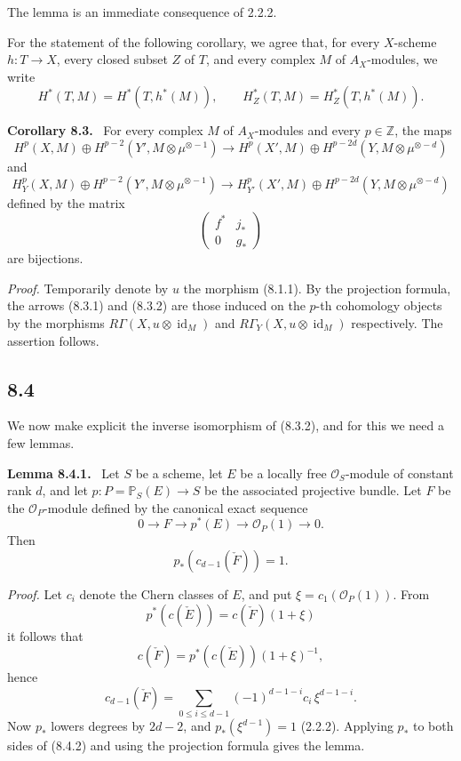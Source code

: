 \documentclass[11pt]{article}
\newenvironment{statement}[1]{\par\medskip\noindent\textbf{#1.}\ }{\par\medskip}
\begin{document}
The lemma is an immediate consequence of 2.2.2.

For the statement of the following corollary, we agree that, for every $X$-scheme $h:T\to X$, every closed subset $Z$ of $T$, and every complex $M$ of $A_X$-modules, we write
\[
H^*(T,M)=H^*(T,h^*(M)),\qquad
H^*_Z(T,M)=H^*_Z(T,h^*(M)).
\]

\begin{statement}{Corollary 8.3}
For every complex $M$ of $A_X$-modules and every $p\in\mathbb Z$, the maps
\[
H^p(X,M)\oplus H^{p-2}(Y',M\otimes\mu^{\otimes -1})
\to
H^p(X',M)\oplus H^{p-2d}(Y,M\otimes\mu^{\otimes -d})
\tag{8.3.1}
\]
and
\[
H_Y^p(X,M)\oplus H^{p-2}(Y',M\otimes\mu^{\otimes -1})
\to
H_{Y'}^p(X',M)\oplus H^{p-2d}(Y,M\otimes\mu^{\otimes -d})
\tag{8.3.2}
\]
defined by the matrix
\[
\begin{pmatrix}
f^*&j_*\\
0&g_*
\end{pmatrix}
\]
are bijections.
\end{statement}

\emph{Proof.} Temporarily denote by $u$ the morphism (8.1.1). By the projection formula, the arrows (8.3.1) and (8.3.2) are those induced on the $p$-th cohomology objects by the morphisms $R\Gamma(X,u\otimes\operatorname{id}_M)$ and $R\Gamma_Y(X,u\otimes\operatorname{id}_M)$ respectively. The assertion follows.

\subsection*{8.4}

We now make explicit the inverse isomorphism of (8.3.2), and for this we need a few lemmas.

\begin{statement}{Lemma 8.4.1}
Let $S$ be a scheme, let $E$ be a locally free $\mathcal O_S$-module of constant rank $d$, and let $p:P=\mathbb P_S(E)\to S$ be the associated projective bundle. Let $F$ be the $\mathcal O_P$-module defined by the canonical exact sequence
\[
0\to F\to p^*(E)\to\mathcal O_P(1)\to0.
\]
Then
\[
p_*(c_{d-1}(\check F))=1.
\]
\end{statement}

\emph{Proof.} Let $c_i$ denote the Chern classes of $E$, and put $\xi=c_1(\mathcal O_P(1))$. From
\[
p^*(c(\check E))=c(\check F)(1+\xi)
\]
it follows that
\[
c(\check F)=p^*(c(\check E))(1+\xi)^{-1},
\]
hence
\[
c_{d-1}(\check F)=\sum_{0\le i\le d-1}(-1)^{d-1-i}c_i\,\xi^{d-1-i}.
\tag{8.4.2}
\]
Now $p_*$ lowers degrees by $2d-2$, and $p_*(\xi^{d-1})=1$ (2.2.2). Applying $p_*$ to both sides of (8.4.2) and using the projection formula gives the lemma.
\end{document}
